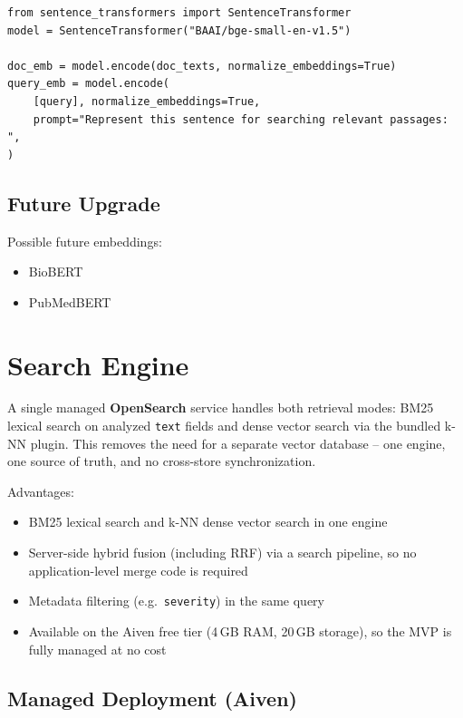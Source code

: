 \documentclass[11pt,a4paper]{article}
\begin{document}
\begin{lstlisting}[basicstyle=\ttfamily\small]
from sentence_transformers import SentenceTransformer
model = SentenceTransformer("BAAI/bge-small-en-v1.5")

doc_emb = model.encode(doc_texts, normalize_embeddings=True)
query_emb = model.encode(
    [query], normalize_embeddings=True,
    prompt="Represent this sentence for searching relevant passages: ",
)
\end{lstlisting}

\subsection{Future Upgrade}

Possible future embeddings:

\begin{itemize}
    \item BioBERT
    \item PubMedBERT
\end{itemize}

\section{Search Engine}

A single managed \textbf{OpenSearch} service handles both retrieval modes: BM25
lexical search on analyzed \texttt{text} fields and dense vector search via the
bundled k-NN plugin. This removes the need for a separate vector database --
one engine, one source of truth, and no cross-store synchronization.

Advantages:

\begin{itemize}
    \item BM25 lexical search and k-NN dense vector search in one engine
    \item Server-side hybrid fusion (including RRF) via a search pipeline, so no
          application-level merge code is required
    \item Metadata filtering (e.g.\ \texttt{severity}) in the same query
    \item Available on the Aiven free tier (4\,GB RAM, 20\,GB storage), so the
          MVP is fully managed at no cost
\end{itemize}

\subsection{Managed Deployment (Aiven)}
\end{document}

